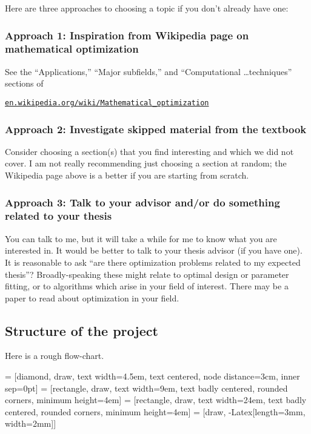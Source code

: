 \documentclass[12pt]{amsart}
\begin{document}
Here are three approaches to choosing a topic if you don't already have one:

\subsubsection*{Approach 1: Inspiration from Wikipedia page on mathematical optimization}  See the ``Applications,'' ``Major subfields,'' and ``Computational \dots techniques'' sections of

   \centerline{\href{https://en.wikipedia.org/wiki/Mathematical_optimization}{\texttt{en.wikipedia.org/wiki/Mathematical\_optimization}}}

\subsubsection*{Approach 2: Investigate skipped material from the textbook}  Consider choosing a section(s) that you find interesting and which we did not cover.  I am not really recommending just choosing a section at random; the Wikipedia page above is a better if you are starting from scratch.

\subsubsection*{Approach 3: Talk to your advisor and/or do something related to your thesis}  You can talk to me, but it will take a while for me to know what you are interested in.  It would be better to talk to your thesis advisor (if you have one).  It is reasonable to ask ``are there optimization problems related to my expected thesis''?  Broadly-speaking these might relate to optimal design or parameter fitting, or to algorithms which arise in your field of interest.  There may be a paper to read about optimization in your field.


\newpage
\subsection*{Structure of the project}  Here is a rough flow-chart.

\bigskip

 = [diamond, draw,
    text width=4.5em, text centered, node distance=3cm, inner sep=0pt]
 = [rectangle, draw,
    text width=9em, text badly centered, rounded corners, minimum height=4em]
 = [rectangle, draw,
    text width=24em, text badly centered, rounded corners, minimum height=4em]
 = [draw, -{Latex[length=3mm, width=2mm]}]
\end{document}
